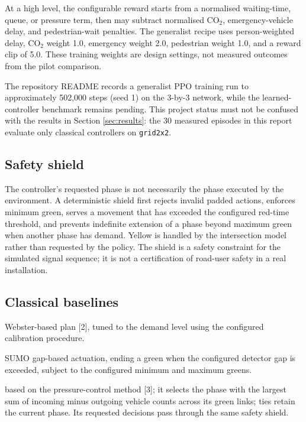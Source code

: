 \documentclass[11pt,a4paper]{article}
\begin{document}
At a high level, the configurable reward starts from a normalised waiting-time,
queue, or pressure term, then may subtract normalised CO$_2$, emergency-vehicle delay,
and pedestrian-wait penalties. The generalist recipe uses person-weighted delay,
CO$_2$ weight 1.0, emergency weight 2.0, pedestrian weight 1.0, and a reward clip of
5.0. These training weights are design settings, not measured outcomes from the pilot
comparison.

The repository README records a generalist PPO training run to approximately 502,000
steps (seed 1) on the 3-by-3 network, while the learned-controller benchmark remains
pending. This project status must not be confused with the results in Section
\ref{sec:results}: the 30 measured episodes in this report evaluate only classical
controllers on \texttt{grid2x2}.

\subsection{Safety shield}
The controller's requested phase is not necessarily the phase executed by the
environment. A deterministic shield first rejects invalid padded actions, enforces
minimum green, serves a movement that has exceeded the configured red-time threshold,
and prevents indefinite extension of a phase beyond maximum green when another phase
has demand. Yellow is handled by the intersection model rather than requested by the
policy. The shield is a safety constraint for the simulated signal sequence; it is not
a certification of road-user safety in a real installation.

\subsection{Classical baselines}
\begin{description}[leftmargin=3.1cm,style=nextline]
  \item[\texttt{ft} - Fixed-time] Webster-based plan [2], tuned to the demand level using
  the configured calibration procedure.
  \item[\texttt{act} - Actuated] SUMO gap-based actuation, ending a green when the
  configured detector gap is exceeded, subject to the configured minimum and maximum
  greens.
  \item[\texttt{mp} - Max-Pressure] based on the pressure-control method [3]; it selects the phase with the largest sum of incoming
  minus outgoing vehicle counts across its green links; ties retain the current phase.
  Its requested decisions pass through the same safety shield.
\end{description}
\end{document}
